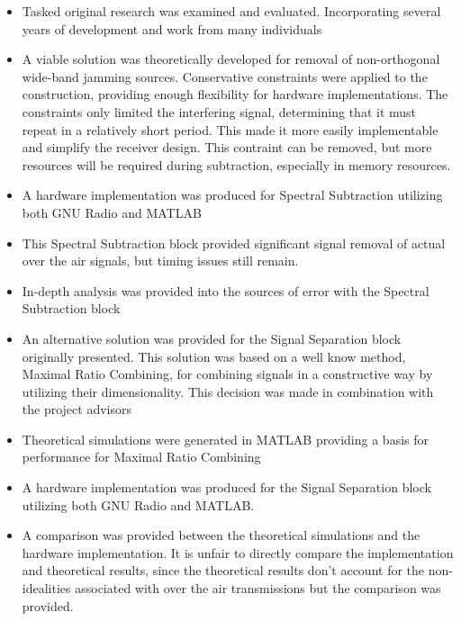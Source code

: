 \begin{itemize}

\item Tasked original research was examined and evaluated. Incorporating several years of development and work from many individuals

\item A viable solution was theoretically developed for removal of non-orthogonal wide-band jamming sources.  Conservative constraints were applied to the construction, providing enough flexibility for hardware implementations.  The constraints only limited the interfering signal, determining that it must repeat in a relatively short period.  This made it more easily implementable and simplify the receiver design.  This contraint can be removed, but more resources will be required during subtraction, especially in memory resources.

\item A hardware implementation was produced for Spectral Subtraction utilizing both GNU Radio and MATLAB

\item This Spectral Subtraction block provided significant signal removal of actual over the air signals, but timing issues still remain.

\item In-depth analysis was provided into the sources of error with the Spectral Subtraction block

\item An alternative solution was provided for the Signal Separation block originally presented.  This solution was based on a well know method, Maximal Ratio Combining, for combining signals in a constructive way by utilizing their dimensionality.  This decision was made in combination with the project advisors

\item Theoretical simulations were generated in MATLAB providing a basis for performance for Maximal Ratio Combining

\item A hardware implementation was produced for the Signal Separation block utilizing both GNU Radio and MATLAB.

\item A comparison was provided between the theoretical simulations and the hardware implementation.  It is unfair to directly compare the implementation and theoretical results, since the theoretical results don't account for the non-idealities associated with over the air transmissions but the comparison was provided. 

\end{itemize}

